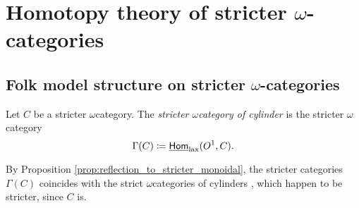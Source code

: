 \section{Homotopy theory of stricter \texorpdfstring{$\omega$}{ω}-categories}

\subsection{Folk model structure on stricter \texorpdfstring{$\omega$}{ω}-categories}


\begin{dfn} 
    Let \( C \) be a stricter \( \omega \)\nbd category.
    The \emph{stricter \( \omega \)\nbd category of cylinder} is the stricter \( \omega \)\nbd category 
    \begin{equation*}
       \Gamma(C) \coloneqq \underline{\mathsf{Hom}}_{\mathrm{lax}}(O^{1}, C). 
    \end{equation*}
\end{dfn}

\begin{rmk} \label{rmk:strict_stricter_same_cylinders}
    By Proposition \ref{prop:reflection_to_stricter_monoidal}, the stricter categories \( \Gamma(C) \) coincides with the strict \( \omega \)\nbd categories of cylinders \cite[Remark 20.2.9]{ara2025polygraphs}, which happen to be stricter, since \( C \) is.
\end{rmk}

